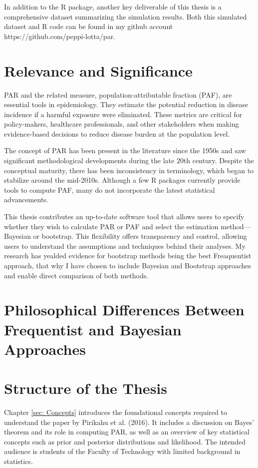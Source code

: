 In addition to the R package, another key deliverable of this thesis is a comprehensive dataset summarizing the simulation results. Both this simulated dataset and R code can be found  in my github account https://github.com/peppi-lotta/par.

\section{Relevance and Significance}

PAR and the related measure, population-attributable fraction (PAF), are essential tools in epidemiology. They estimate the potential reduction in disease incidence if a harmful exposure were eliminated. These metrics are critical for policy-makers, healthcare professionals, and other stakeholders when making evidence-based decisions to reduce disease burden at the population level.

The concept of PAR has been present in the literature since the 1950s and saw significant methodological developments during the late 20th century. Despite the conceptual maturity, there has been inconsistency in terminology, which began to stabilize around the mid-2010s. Although a few R packages currently provide tools to compute PAF, many do not incorporate the latest statistical advancements.

This thesis contributes an up-to-date software tool that allows users to specify whether they wish to calculate PAR or PAF and select the estimation method—Bayesian or bootstrap. This flexibility offers transparency and control, allowing users to understand the assumptions and techniques behind their analyses. My research has yealded evidence for bootstrap methods being the best Freaquentist approach, that why I have chosen to include Bayesian and Bootstrap approaches and enable direct comparison of both methods.

\section{Philosophical Differences Between Frequentist and Bayesian Approaches}


\section{Structure of the Thesis} \label{sec:Structure}

Chapter \ref{sec: Concepts} introduces the foundational concepts required to understand the paper by Pirikahu et al. (2016). It includes a discussion on Bayes' theorem and its role in computing PAR, as well as an overview of key statistical concepts such as prior and posterior distributions and likelihood. The intended audience is students of the Faculty of Technology with limited background in statistics.

